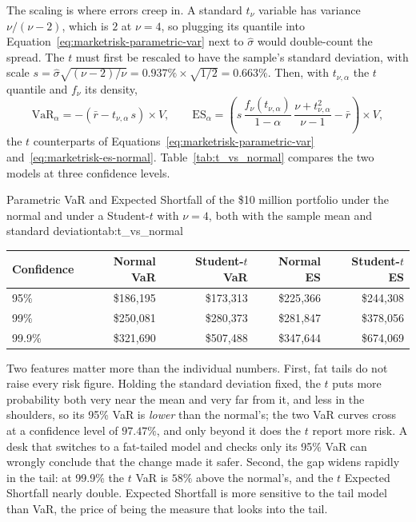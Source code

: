 \documentclass[../ai_in_finance]{subfiles}
\begin{document}
The scaling is where errors creep in. A standard $t_\nu$ variable has variance $\nu/(\nu-2)$, which is $2$ at $\nu=4$, so plugging its quantile into Equation~\eqref{eq:marketrisk-parametric-var} next to $\hat\sigma$ would double-count the spread. The $t$ must first be rescaled to have the sample's standard deviation, with scale $s = \hat\sigma\sqrt{(\nu-2)/\nu} = 0.937\%\times\sqrt{1/2} = 0.663\%$. Then, with $t_{\nu,\alpha}$ the $t$ quantile and $f_\nu$ its density,
\begin{equation}
\label{eq:marketrisk-t-var-es}
\text{VaR}_\alpha = -(\bar r - t_{\nu,\alpha}\,s)\times V, \qquad
\text{ES}_\alpha = \left(s\,\frac{f_\nu(t_{\nu,\alpha})}{1-\alpha}\,\frac{\nu+t_{\nu,\alpha}^2}{\nu-1} - \bar r\right)\times V,
\end{equation}
the $t$ counterparts of Equations~\eqref{eq:marketrisk-parametric-var} and~\eqref{eq:marketrisk-es-normal}. Table~\ref{tab:t_vs_normal} compares the two models at three confidence levels.

\begin{booktable}[htbp]{Parametric VaR and Expected Shortfall of the \$10 million portfolio under the normal and under a Student-$t$ with $\nu=4$, both with the sample mean and standard deviation}{tab:t_vs_normal}
\begin{tabular}{lrrrr}
\toprule
Confidence & Normal VaR & Student-$t$ VaR & Normal ES & Student-$t$ ES \\
\midrule
95\%   & \$186{,}195 & \$173{,}313 & \$225{,}366 & \$244{,}308 \\
99\%   & \$250{,}081 & \$280{,}373 & \$281{,}847 & \$378{,}056 \\
99.9\% & \$321{,}690 & \$507{,}488 & \$347{,}644 & \$674{,}069 \\
\bottomrule
\end{tabular}
\end{booktable}

Two features matter more than the individual numbers. First, fat tails do not raise every risk figure. Holding the standard deviation fixed, the $t$ puts more probability both very near the mean and very far from it, and less in the shoulders, so its 95\% VaR is \emph{lower} than the normal's; the two VaR curves cross at a confidence level of $97.47\%$, and only beyond it does the $t$ report more risk. A desk that switches to a fat-tailed model and checks only its 95\% VaR can wrongly conclude that the change made it safer. Second, the gap widens rapidly in the tail: at 99.9\% the $t$ VaR is $58\%$ above the normal's, and the $t$ Expected Shortfall nearly double. Expected Shortfall is more sensitive to the tail model than VaR, the price of being the measure that looks into the tail.
\end{document}

